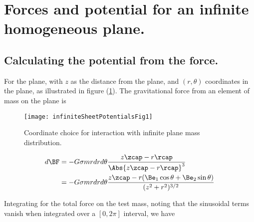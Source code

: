 \section{Forces and potential for an infinite homogeneous plane.}

\subsection{Calculating the potential from the force.}

For the plane, with $z$ as the distance from the plane, and $(r,\theta)$ coordinates in the plane, as illustrated in figure (\ref{fig:infiniteSheetPotentials:infiniteSheetPotentialsFig1}).  The gravitational force from an element of mass on the plane is
\begin{figure}[htp]
   \centering
   \texttt{[image: infiniteSheetPotentialsFig1]}
   \caption{Coordinate choice for interaction with infinite plane mass distribution.}\label{fig:infiniteSheetPotentials:infiniteSheetPotentialsFig1}
\end{figure}

\begin{align*}
d\BF
&= -G \sigma m r dr d\theta \frac{z \zcap - r \rcap}{\Abs{z \zcap - r \rcap}^3 } \\
&= -G \sigma m r dr d\theta \frac{z \zcap - r (\Be_1 \cos\theta + \Be_2 \sin\theta) }{(z^2 + r^2)^{3/2} } \\
\end{align*}

%
%
Integrating for the total force on the test mass, noting that the sinusoidal terms vanish when integrated over a $[0, 2 \pi]$ interval, we have

